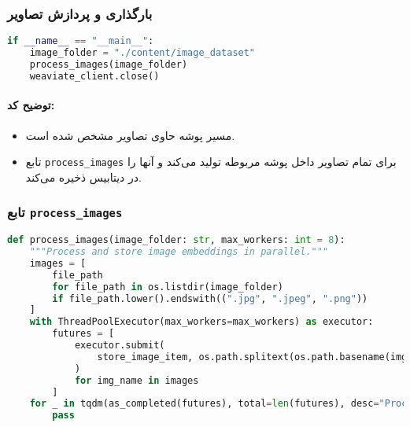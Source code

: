 \documentclass{article}
\begin{document}
\subsubsection*{بارگذاری و پردازش تصاویر}

\begin{latin}
\begin{lstlisting}[language=python]
if __name__ == "__main__":
    image_folder = "./content/image_dataset"
    process_images(image_folder)
    weaviate_client.close()
\end{lstlisting}
\end{latin}

\paragraph{توضیح کد:}
\begin{itemize}
    \item مسیر پوشه حاوی تصاویر مشخص شده است.
    \item تابع \texttt{process\_images} برای تمام تصاویر داخل پوشه مربوطه  تولید می‌کند و آنها را در دیتابیس ذخیره می‌کند.
\end{itemize}

\subsubsection*{تابع \texttt{process\_images}}

\begin{latin}
\begin{lstlisting}[language=python]
def process_images(image_folder: str, max_workers: int = 8):
    """Process and store image embeddings in parallel."""
    images = [
        file_path
        for file_path in os.listdir(image_folder)
        if file_path.lower().endswith((".jpg", ".jpeg", ".png"))
    ]
    with ThreadPoolExecutor(max_workers=max_workers) as executor:
        futures = [
            executor.submit(
                store_image_item, os.path.splitext(os.path.basename(img_name))[0], img_name
            )
            for img_name in images
        ]
    for _ in tqdm(as_completed(futures), total=len(futures), desc="Processing images"):
        pass
\end{lstlisting}
\end{latin}
\end{document}
